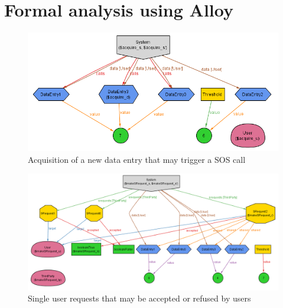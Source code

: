 \def \sourcepath {model.als}

\section{Formal analysis using Alloy}
\label{sec:alloy}

  

  \begin{figure}[h!]
    \centering
    \hspace*{-0cm}
    \includegraphics[width=\textwidth]{img/alloy/alloy_acquire.png}
    \caption{Acquisition of a new data entry that may trigger a SOS call}
    \label{fig:alloy_acquire}
  \end{figure}

  \begin{figure}[h!]
    \centering
    \hspace*{-1.5cm}
    \includegraphics[width=1.15\textwidth]{img/alloy/alloy_srequest.png}
    \caption{Single user requests that may be accepted or refused by users}
    \label{fig:alloy_srequest}
  \end{figure}

